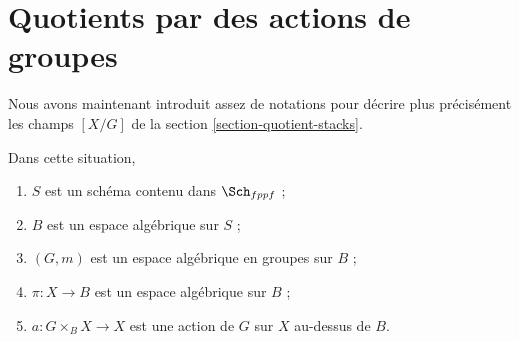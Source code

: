 \section{Quotients par des actions de groupes}
\label{section-group-quotient-stacks}

\noindent
Nous avons maintenant introduit assez de notations pour décrire
plus précisément les champs $[X/G]$ de la
section \ref{section-quotient-stacks}.

\begin{situation}
\label{situation-quotient-stack}
Dans cette situation,
\begin{enumerate}
\item $S$ est un schéma contenu dans $\Sch_{fppf}$ ;
\item $B$ est un espace algébrique sur $S$ ;
\item $(G, m)$ est un espace algébrique en groupes sur $B$ ;
\item $\pi : X \to B$ est un espace algébrique sur $B$ ;
\item $a : G \times_B X \to X$ est une action de $G$ sur $X$ au-dessus de $B$.
\end{enumerate}
\end{situation}

